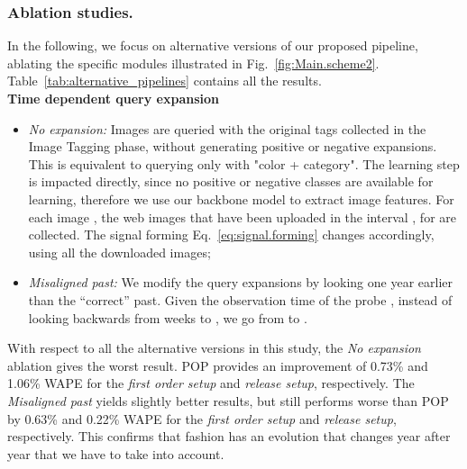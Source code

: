 \documentclass[runningheads]{llncs}
\newcommand{\snamebig}[0] {POP\xspace}
\begin{document}
\subsubsection{Ablation studies.}\label{sec:alternative}
In the following, we focus on alternative versions of our proposed pipeline, ablating the specific modules illustrated in Fig.~\ref{fig:Main.scheme2}.
Table~\ref{tab:alternative_pipelines} contains all the results.\\
\noindent\textbf{Time dependent query expansion}
\begin{itemize} [noitemsep, leftmargin=*]
    \item{\emph{No expansion:}} Images are queried with the original tags collected in the Image Tagging phase, without generating positive or negative expansions. This is equivalent to querying only with "color + category". The learning step is impacted directly, since no positive or negative classes are available for learning, therefore we use our backbone model to extract image features. For each image , the web images  that have been uploaded in the interval , for  are collected. The signal forming Eq.~\ref{eq:signal.forming} changes accordingly, using all the  downloaded images;
    \item{\emph{Misaligned past:}} We modify the query expansions by looking one year earlier than the ``correct'' past. Given the observation time  of the probe , instead of looking backwards from  weeks to , we go from  to .
    \vspace{-0.1cm}
\end{itemize}
With respect to all the alternative versions in this study, the \emph{No expansion} ablation gives the worst result. \snamebig provides an improvement of 0.73\% and 1.06\% WAPE for the \emph{first order setup} and \emph{release setup}, respectively.   
The \emph{Misaligned past} yields slightly better results, but still performs worse than \snamebig by 0.63\% and 0.22\% WAPE for the \emph{first order setup} and \emph{release setup}, respectively. This confirms that fashion has an evolution that changes year after year that we have to take into account.
\end{document}
